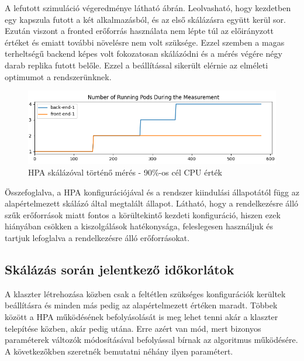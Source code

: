 A lefutott szimuláció végeredménye látható  ábrán.
Leolvasható, hogy kezdetben egy kapszula futott a két alkalmazásból, és az első skálázásra együtt kerül sor.
Ezután viszont a fronted erőforrás használata nem lépte túl az előirányzott értéket és emiatt további növelésre nem volt szüksége.
Ezzel szemben a magas terheltségű backend képes volt fokozatosan skálázódni és a mérés végére négy darab replika futott belőle.
Ezzel a beállítással sikerült elérnie az elméleti optimumot a rendszerünknek.

\begin{figure}[!ht]
	\centering
	\includegraphics[width=150mm, keepaspectratio]{figures/HPA-scaling-in-the-same-time_90_percent_2.png}
	\caption{HPA skálázóval történő mérés - 90\%-os cél CPU érték}
	\label{fig:HPA-scaling-in-the-same-time_90_percent}
\end{figure}

Összefoglalva, a HPA konfigurációjával és a rendszer kiindulási állapotától függ az alapértelmezett skálázó által megtalált állapot.
Látható, hogy a rendelkezésre álló szűk erőforrások miatt fontos a körültekintő kezdeti konfiguráció, hiszen ezek hiányában csökken a kiszolgálások hatékonysága, feleslegesen használjuk és tartjuk lefoglalva a rendelkezésre álló erőforrásokat.

\subsection{Skálázás során jelentkező időkorlátok}
A klaszter létrehozása közben csak a feltétlen szükséges konfigurációk kerültek beállításra és minden más pedig az alapértelmezett értéken maradt.
Többek között a HPA működésének befolyásolását is meg lehet tenni akár a klaszter telepítése közben, akár pedig utána.
Erre azért van mód, mert bizonyos paraméterek változók módosításával befolyással bírnak az algoritmus működésére\citep{kubernetesHPADocumentation}.
A következőkben szeretnék bemutatni néhány ilyen paramétert.

